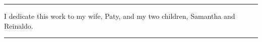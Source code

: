 \null
\vfill


\begin{center}
\noindent\rule[2pt]{0.1\textwidth}{1pt}
I dedicate this work to my wife, Paty, and my two children, Samantha and
Reinaldo.
\noindent\rule[2pt]{0.1\textwidth}{1pt}
\end{center}


\vfill

\clearpage
